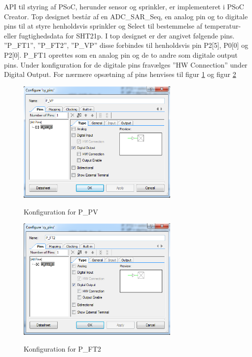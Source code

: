 
API til styring af PSoC, herunder sensor og sprinkler, er implementeret i PSoC Creator. Top designet består af en ADC\_SAR\_Seq, en analog pin og to digitale pins til at styre henholdsvis sprinkler og Select til bestemmelse af temperatur- eller fugtighedsdata for SHT21p.
I top designet er der angivet følgende pins. ''P\_FT1'', ''P\_FT2'', ''P\_VP'' disse forbindes til henholdsvis pin P2[5], P0[0] og P2[0]. P\_FT1 oprettes som en analog pin og de to andre som digitale output pins. Under konfiguration for de digitale pins fravælges ''HW Connection'' under Digital Output. For nærmere opsætning af pins henvises til figur \ref{lab:P_PV_config} og figur \ref{lab:P_FT2_config}

\begin{figure}[htb]
\centering
{\includegraphics[width=0.70\textwidth]{filer/pics/P_PV_config.png}}
\caption{Konfiguration for P\_PV}
\label{lab:P_PV_config}
\end{figure}


\begin{figure}[htb]
\centering
{\includegraphics[width=0.70\textwidth]{filer/pics/P_FT2_config.png}}
\caption{Konfiguration for P\_FT2}
\label{lab:P_FT2_config}
\end{figure}  

